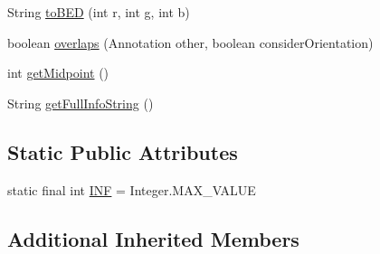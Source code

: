 \begin{DoxyCompactItemize}
\item 
String \hyperlink{classbroad_1_1core_1_1sequence_1_1_sequence_region_a33aebcdeeed1a689367c7adf36fa53cc}{to\+B\+E\+D} (int r, int g, int b)
\item 
boolean \hyperlink{classbroad_1_1core_1_1sequence_1_1_sequence_region_a9a0309729bd2f4f8e0e0dc9bc70d3244}{overlaps} (Annotation other, boolean consider\+Orientation)
\item 
int \hyperlink{classbroad_1_1core_1_1sequence_1_1_sequence_region_a2349bf9ffd84ef978ecc06e0db1804d4}{get\+Midpoint} ()
\item 
String \hyperlink{classbroad_1_1core_1_1sequence_1_1_sequence_region_a0ceb54ae1082e7c7844698140ebb9985}{get\+Full\+Info\+String} ()
\end{DoxyCompactItemize}
\subsection*{Static Public Attributes}
\begin{DoxyCompactItemize}
\item 
static final int \hyperlink{classbroad_1_1core_1_1sequence_1_1_sequence_region_ad709c721bc2e22de2f16c1af52721d6f}{I\+N\+F} = Integer.\+M\+A\+X\+\_\+\+V\+A\+L\+U\+E
\end{DoxyCompactItemize}
\subsection*{Additional Inherited Members}



